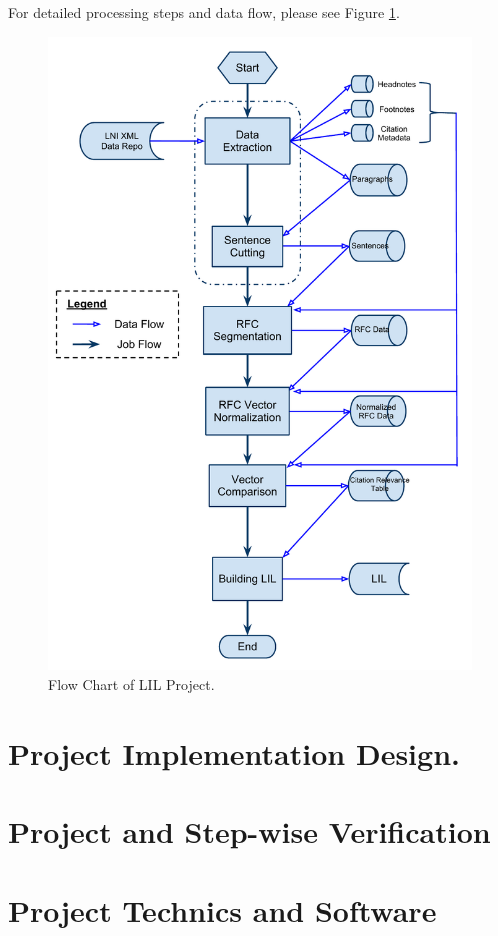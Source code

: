 \documentclass[12pt]{article}
\begin{document}
For detailed processing steps and data flow, please see Figure
\ref{fig:proj_flow}. 

\begin{figure}[t]
\centering
\includegraphics[width=1.0\textwidth]{LILFlowChart.pdf}
\caption{Flow Chart of LIL Project.}
\label{fig:proj_flow}
\end{figure}

\section{Project Implementation Design.}

\section{Project and Step-wise Verification}

\section{Project Technics and Software}
\end{document}
